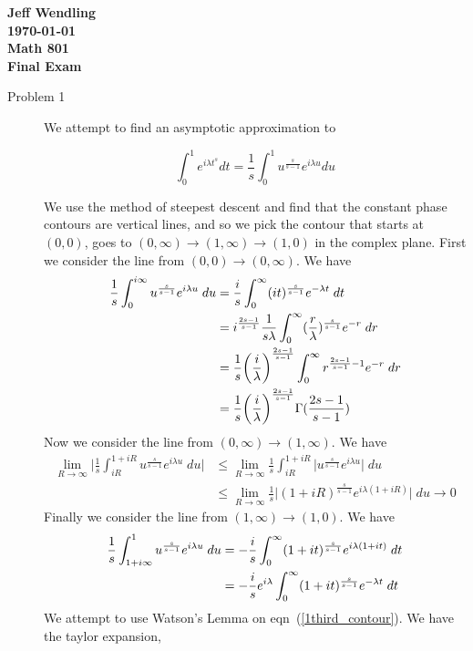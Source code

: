 \documentclass[11pt]{article}
\newcommand{\eq}[1]{\begin{align*}#1\end{align*}}
\newcommand{\eqn}[2]{
  \begin{equation}
    \label{#1}
    #2
  \end{equation}
}
\newcommand{\lam}{\lambda}
\newcommand{\eqr}[1]{eqn~(\ref{#1})}
\begin{document}
\begin{center}
{\large\bf 
Jeff Wendling\\
\today\\
Math 801\\
Final Exam
}
\end{center}
\begin{description}
\item[Problem 1]
We attempt to find an asymptotic approximation to
\eqn{1eqn}{
  \int_0^1 e^{i\lam t^s} dt = \frac{1}{s} \int_0^1 u^\frac{s}{s-1} e^{i\lam u} du
}
We use the method of steepest descent and find that the constant phase contours are
vertical lines, and so we pick the contour that starts at $(0,0)$, goes to $(0, \infty) \rightarrow (1,\infty) \rightarrow (1,0)$ in the complex plane.
First we consider the line from $(0,0) \rightarrow (0,\infty)$. We have
\begin{align}
\notag
  \frac{1}{s} \int_0^{i \infty} u^\frac{s}{s-1} e^{i\lam u} \; du
  &=
  \frac{i}{s} \int_0^\infty (it)^\frac{s}{s-1} e^{-\lam t} \; dt
  \\
\notag
  &= 
  i^\frac{2s-1}{s-1}
  \frac{1}{s\lam}
  \int_0^\infty
  (\frac{r}{\lam})^\frac{s}{s-1} e^{-r}
  \; dr
  \\
\notag
  &=
  \frac{1}{s}
  \bigg(\frac{i}{\lam}\bigg)^\frac{2s-1}{s-1}
  \int_0^\infty
  r^{\frac{2s-1}{s-1} - 1} e^{-r}
  \; dr
  \\
  \label{1first_approx}
  &=
  \frac{1}{s}
  \bigg(\frac{i}{\lam}\bigg)^\frac{2s-1}{s-1}
  \Gamma(
    \frac{2s-1}{s-1}
  )
\end{align}
Now we consider the line from $(0,\infty) \rightarrow (1,\infty)$. We have
\eq{
  \lim_{R\rightarrow \infty} \bigg|\frac{1}{s} \int_{iR}^{1+iR} u^\frac{s}{s-1} e^{i\lam u} \; du \bigg|
  &\leq
  \lim_{R\rightarrow \infty} \frac{1}{s} \int_{iR}^{1+iR}\bigg|u^\frac{s}{s-1} e^{i\lam u}\bigg| \; du \\
  &\leq
  \lim_{R\rightarrow \infty} \frac{1}{s} \bigg|(1+iR)^\frac{s}{s-1} e^{i\lam (1+iR)}\bigg| \; du \rightarrow 0
}
Finally we consider the line from $(1,\infty) \rightarrow (1,0)$. We have
\begin{align}
  \notag
  \frac{1}{s} \int_{1+i\infty}^{1} u^\frac{s}{s-1} e^{i\lam u} \; du
  &=
  -\frac{i}{s} \int_0^\infty (1+it)^\frac{s}{s-1} e^{i\lam (1+it)} \; dt
  \\
  \label{1third_contour}
  &=
  -\frac{i}{s}
  e^{i\lam}
  \int_0^\infty (1+it)^\frac{s}{s-1} e^{-\lam t} \; dt
\end{align}
We attempt to use Watson's Lemma on \eqr{1third_contour}. We have the taylor expansion,

\end{description}
\end{document}
